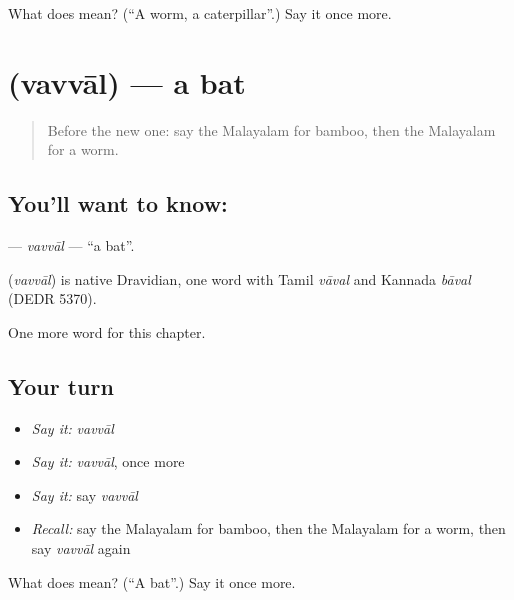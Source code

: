 \begin{tcolorbox}[breakable,colback=teal!4,colframe=teal!35!black,title={Before you move on}]
What does  mean? (\textquotedblleft{}A worm, a caterpillar\textquotedblright{}.) Say it once more.
\end{tcolorbox}
\section[\texorpdfstring{\ml{വവ്വാൽ} (vavvāl)}{വവ്വാൽ (vavvāl)}]{ (vavvāl) — a bat}

\label{lesson:ML-C213-vavval}



\begin{quote}
Before the new one: say the Malayalam for bamboo, then the Malayalam for a worm.
\end{quote}

\subsection*{You'll want to know: }
\textbf{} — \emph{vavvāl} — \textquotedblleft{}a bat\textquotedblright{}.

\begin{cousinweb}
\textbf{} (\emph{vavvāl}) is native Dravidian, one word with Tamil \emph{vāval} and Kannada \emph{bāval} (DEDR 5370).
\end{cousinweb}

\begin{grammarlens}[title={What you've built}]
One more word for this chapter.
\end{grammarlens}

\subsection*{Your turn}
\begin{itemize}
\raggedright
  \item \emph{Say it:} \emph{vavvāl}
  \item \emph{Say it:} \emph{vavvāl}, once more
  \item \emph{Say it:} say \emph{vavvāl}
  \item \emph{Recall:} say the Malayalam for bamboo, then the Malayalam for a worm, then say \emph{vavvāl} again
\end{itemize}

\begin{tcolorbox}[breakable,colback=teal!4,colframe=teal!35!black,title={Before you move on}]
What does  mean? (\textquotedblleft{}A bat\textquotedblright{}.) Say it once more.
\end{tcolorbox}
